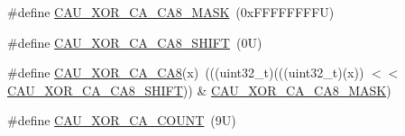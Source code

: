 \begin{DoxyCompactItemize}
\item 
\#define \mbox{\hyperlink{group___c_a_u___register___masks_ga5dae0bacc10008301389f42a02bdd3d4}{C\+A\+U\+\_\+\+X\+O\+R\+\_\+\+C\+A\+\_\+\+C\+A8\+\_\+\+M\+A\+SK}}~(0x\+F\+F\+F\+F\+F\+F\+F\+F\+U)
\item 
\#define \mbox{\hyperlink{group___c_a_u___register___masks_gab7debaaae0a6137460fd18cf952033ae}{C\+A\+U\+\_\+\+X\+O\+R\+\_\+\+C\+A\+\_\+\+C\+A8\+\_\+\+S\+H\+I\+FT}}~(0\+U)
\item 
\#define \mbox{\hyperlink{group___c_a_u___register___masks_gab9536ffd1d268cd301992645fd13d7fa}{C\+A\+U\+\_\+\+X\+O\+R\+\_\+\+C\+A\+\_\+\+C\+A8}}(x)~(((uint32\+\_\+t)(((uint32\+\_\+t)(x)) $<$$<$ \mbox{\hyperlink{group___c_a_u___register___masks_gab7debaaae0a6137460fd18cf952033ae}{C\+A\+U\+\_\+\+X\+O\+R\+\_\+\+C\+A\+\_\+\+C\+A8\+\_\+\+S\+H\+I\+FT}})) \& \mbox{\hyperlink{group___c_a_u___register___masks_ga5dae0bacc10008301389f42a02bdd3d4}{C\+A\+U\+\_\+\+X\+O\+R\+\_\+\+C\+A\+\_\+\+C\+A8\+\_\+\+M\+A\+SK}})
\item 
\#define \mbox{\hyperlink{group___c_a_u___register___masks_gaf5ad2b96dd9e2c68769376dc73009090}{C\+A\+U\+\_\+\+X\+O\+R\+\_\+\+C\+A\+\_\+\+C\+O\+U\+NT}}~(9\+U)
\end{DoxyCompactItemize}
